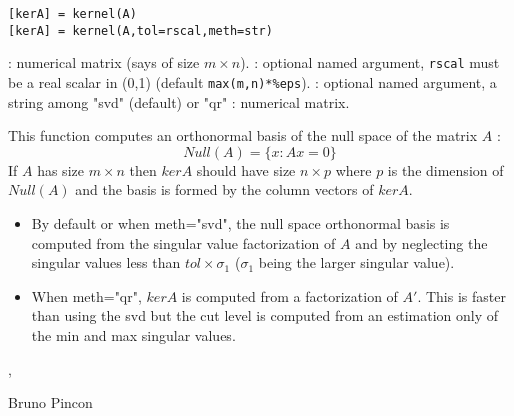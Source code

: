
\begin{mandesc}
\end{mandesc}

\begin{calling_sequence}
\begin{verbatim}
[kerA] = kernel(A) 
[kerA] = kernel(A,tol=rscal,meth=str) 
\end{verbatim}
\end{calling_sequence}
\begin{parameters}
  \begin{varlist}
    :  numerical matrix (says of size $m \times n$).
    : optional named argument, \verb+rscal+ must be  a real scalar in (0,1) (default \verb+max(m,n)*%eps+).
    : optional named argument, a string among "svd" (default) or "qr"
    : numerical matrix.
  \end{varlist}
\end{parameters}

\begin{mandescription}
This function computes an orthonormal basis of the null space of the
matrix $A$ :
$$
    Null(A) = \{ x : Ax = 0 \} 
$$
 If $A$ has size $m \times n$ then $kerA$ should have 
size $n \times p$ where $p$ is the dimension of  $Null(A)$ 
and the basis is formed by the column vectors of $kerA$. 
\begin{itemize}
\item By default or when  meth="svd", the null space orthonormal basis 
is computed from the singular value factorization of $A$ and by 
neglecting the singular values less than $tol \times \sigma_1$
($\sigma_1$ being the larger singular value). 
\item When  meth="qr", $kerA$ is computed from a  
factorization of $A'$. This is faster than using the svd but 
the cut level is computed from an estimation only of the min 
and max singular values.
\end{itemize}
\end{mandescription}

\begin{examples}
  \begin{program}
  \end{program}
\end{examples}

\begin{manseealso}
  , 
\end{manseealso}

\begin{authors}
   Bruno Pincon
\end{authors}

